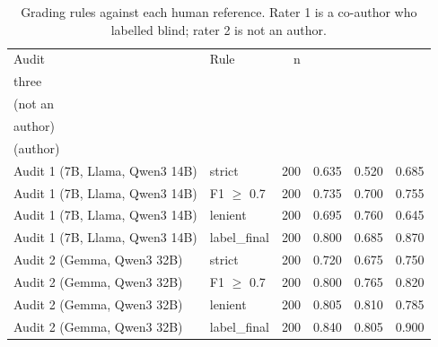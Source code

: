 \begin{table}[t]
\centering\small
\setlength{\tabcolsep}{4pt}
\caption{Grading rules against each human reference. Rater 1 is a co-author who labelled blind; rater 2 is not an author.}
\label{tab:rater}
\begin{tabular*}{\linewidth}{@{\extracolsep{\fill}}llrrrr}
\toprule
Audit & Rule & n & \begin{tabular}[b]{@{}r@{}}Majority of \\ three\end{tabular} & \begin{tabular}[b]{@{}r@{}}Rater 2 alone \\ (not an \\ author)\end{tabular} & \begin{tabular}[b]{@{}r@{}}Rater 1 alone \\ (author)\end{tabular} \\
\midrule
Audit 1 (7B, Llama, Qwen3 14B) & strict & 200 & 0.635 & 0.520 & 0.685 \\
Audit 1 (7B, Llama, Qwen3 14B) & F1 $\geq$ 0.7 & 200 & 0.735 & 0.700 & 0.755 \\
Audit 1 (7B, Llama, Qwen3 14B) & lenient & 200 & 0.695 & 0.760 & 0.645 \\
Audit 1 (7B, Llama, Qwen3 14B) & label\_final & 200 & 0.800 & 0.685 & 0.870 \\
Audit 2 (Gemma, Qwen3 32B) & strict & 200 & 0.720 & 0.675 & 0.750 \\
Audit 2 (Gemma, Qwen3 32B) & F1 $\geq$ 0.7 & 200 & 0.800 & 0.765 & 0.820 \\
Audit 2 (Gemma, Qwen3 32B) & lenient & 200 & 0.805 & 0.810 & 0.785 \\
Audit 2 (Gemma, Qwen3 32B) & label\_final & 200 & 0.840 & 0.805 & 0.900 \\
\bottomrule
\end{tabular*}
\end{table}
